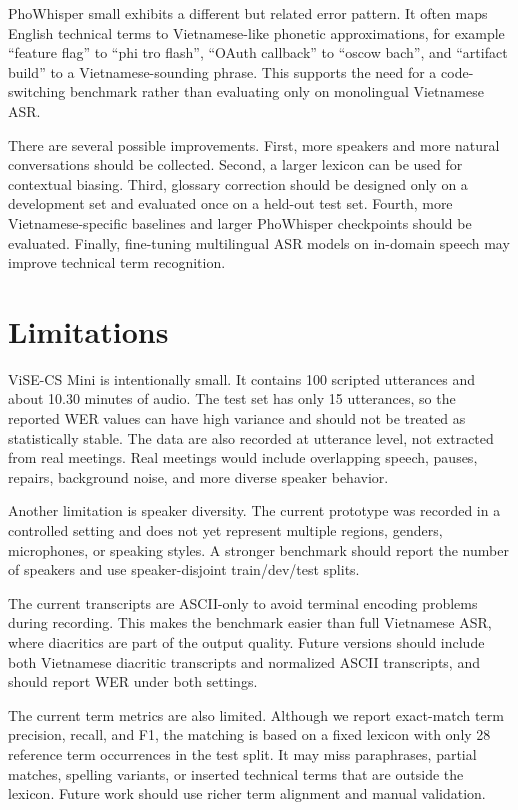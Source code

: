 \documentclass[conference]{IEEEtran}
\begin{document}
PhoWhisper small exhibits a different but related error pattern. It often maps English technical terms to Vietnamese-like phonetic approximations, for example ``feature flag'' to ``phi tro flash'', ``OAuth callback'' to ``oscow bach'', and ``artifact build'' to a Vietnamese-sounding phrase. This supports the need for a code-switching benchmark rather than evaluating only on monolingual Vietnamese ASR.

There are several possible improvements. First, more speakers and more natural conversations should be collected. Second, a larger lexicon can be used for contextual biasing. Third, glossary correction should be designed only on a development set and evaluated once on a held-out test set. Fourth, more Vietnamese-specific baselines and larger PhoWhisper checkpoints should be evaluated. Finally, fine-tuning multilingual ASR models on in-domain speech may improve technical term recognition.

\section{Limitations}
ViSE-CS Mini is intentionally small. It contains 100 scripted utterances and about 10.30 minutes of audio. The test set has only 15 utterances, so the reported WER values can have high variance and should not be treated as statistically stable. The data are also recorded at utterance level, not extracted from real meetings. Real meetings would include overlapping speech, pauses, repairs, background noise, and more diverse speaker behavior.

Another limitation is speaker diversity. The current prototype was recorded in a controlled setting and does not yet represent multiple regions, genders, microphones, or speaking styles. A stronger benchmark should report the number of speakers and use speaker-disjoint train/dev/test splits.

The current transcripts are ASCII-only to avoid terminal encoding problems during recording. This makes the benchmark easier than full Vietnamese ASR, where diacritics are part of the output quality. Future versions should include both Vietnamese diacritic transcripts and normalized ASCII transcripts, and should report WER under both settings.

The current term metrics are also limited. Although we report exact-match term precision, recall, and F1, the matching is based on a fixed lexicon with only 28 reference term occurrences in the test split. It may miss paraphrases, partial matches, spelling variants, or inserted technical terms that are outside the lexicon. Future work should use richer term alignment and manual validation.
\end{document}
